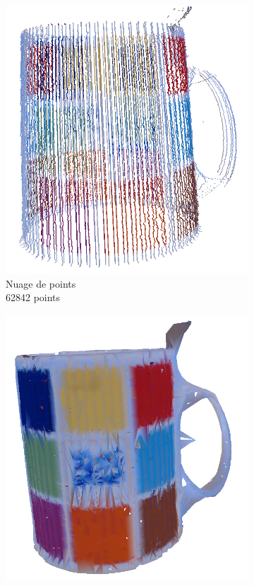 \documentclass[a4paper,10pt]{report}
\begin{document}
\begin{figure}[h!]
	\centering
    \begin{subfigure}[b]{0.3\textwidth}
	    \includegraphics[width=\textwidth]{results/nodp-pointcloud.png}
        \caption{Nuage de points\\62842 points}
    \end{subfigure}
    \begin{subfigure}[b]{0.3\textwidth}
	    \includegraphics[width=\textwidth]{results/nodp-ipd.png}

\end{subfigure}
\end{figure}
\end{document}
